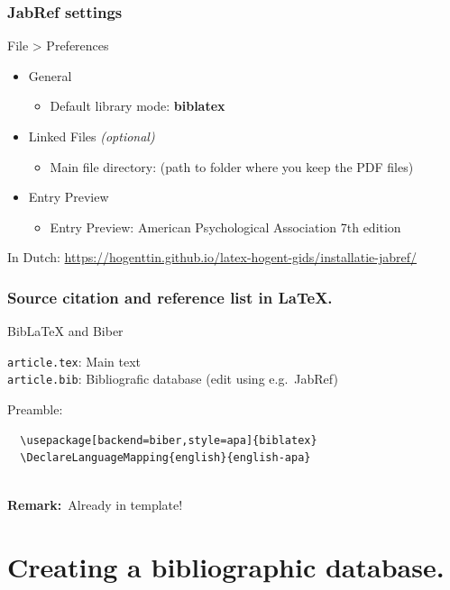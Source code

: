 \documentclass[aspectratio=169]{beamer}
\begin{document}
\begin{frame}
    \frametitle{JabRef settings}
    
   File > Preferences

   \begin{itemize}
        \item General
        \begin{itemize}
            \item Default library mode: \textbf{biblatex}
        \end{itemize}
        \item Linked Files \textit{(optional)}
        \begin{itemize}
            \item Main file directory: (path to folder where you keep the PDF files)
        \end{itemize}
        \item{Entry Preview}
        \begin{itemize}
            \item Entry Preview: American Psychological Association 7th edition
        \end{itemize}
    \end{itemize}
    \bigskip
    In Dutch: \url{https://hogenttin.github.io/latex-hogent-gids/installatie-jabref/}
    
\end{frame}
\begin{frame}[fragile]
  \frametitle{Source citation and reference list in {\LaTeX}.}

  Bib{\LaTeX} and Biber

  \vspace{18pt}

  \verb|article.tex|: Main text\\
  \verb|article.bib|: Bibliografic database (edit using e.g.~JabRef)

  \bigskip

  Preamble:

  \begin{verbatim}
  \usepackage[backend=biber,style=apa]{biblatex}
  \DeclareLanguageMapping{english}{english-apa}
  
  \end{verbatim}

    \textbf{Remark:}\ Already in template!   

\end{frame}

\section{Creating a bibliographic database.}
\end{document}

